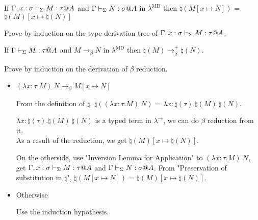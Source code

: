 \begin{lemma}
	If $\G, x:\sigma \V M:\tau@A$ and $\G \V N:\sigma@A$ in $\lambda^{\text{MD}}$
	then $\natural(M[x \mapsto N])$ = $\natural(M)[x\mapsto\natural(N)]$
\end{lemma}
	
Prove by induction on the type derivation tree of $\G, x:\sigma \V M:\tau@A$.
	
\begin{lemma}
	If $\G \V M:\tau@A$ and $M \longrightarrow_\beta N$ in $\lambda^{\text{MD}}$
	then $\natural(M) \longrightarrow_\beta^+ \natural(N)$.
\end{lemma}
	
Prove by induction on the derivation of $\beta$ reduction.
	
\begin{itemize}
	\newcommand{\R}{\longrightarrow_{\beta}}
	\item $(\lambda x:\tau.M)\ N \R M[x \mapsto N]$
	      	      	      	      	      	      	      	      	      	      		      	      	      	      
	      From the definition of $\natural$, $\natural((\lambda x:\tau.M)\ N)$ = $\lambda x:\natural(\tau).\natural(M)\ \natural(N)$.
	      	      	      	      	      	      	      	      	      	      		      	      	      	      
	      $\lambda x:\natural(\tau).\natural(M)\ \natural(N)$ is a typed term in $\lambda^\to$, we can do $\beta$ reduction from it.\\
	      As a result of the reduction, we get $\natural(M)[x\mapsto\natural(N)]$.
	      	      	      	      	      	      	      	      	      	      		      	      	      	      
	      On the otherside, use "Inversion Lemma for Application" to $(\lambda x:\tau.M)\ N$, get $\G, x:\sigma \V M:\tau@A$ and $\G \V N:\sigma@A$.
	      From "Preservation of substitution in $\natural$", $\natural(M[x \mapsto N])$ = $\natural(M)[x\mapsto\natural(N)]$.
	      	      	      	      	      	      	      	      	      	      		      	      	      	      
	\item Otherwise
	      	      	      	      	      	      	      	      	      	      		      	      	      	      
	      Use the induction hypothesis.
\end{itemize}
	
